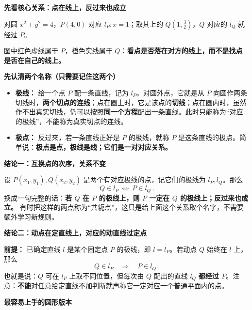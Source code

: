 \begin{statementbox}
\textbf{\textcolor{CStatement}{先看核心关系：点在线上，反过来也成立}}

对圆 $x^2+y^2=4$，$P(4,0)$ 对应 $l_P:x=1$；取其上的 $Q(1,\frac32)$，$Q$ 对应的 $l_Q$ 就经过 $P$。

\begin{center}

\end{center}
图中红色虚线属于 $P$，橙色实线属于 $Q$：\textbf{看点是否落在对方的线上，而不是找点是否在自己的线上。}

\medskip
\textbf{\textcolor{CStatement}{先认清两个名称（只需要记住这两个）}}
\begin{itemize}[leftmargin=*,itemsep=0.3em]
\item \textbf{极线：} 给一个点 $P$ 配一条直线，记为 $l_P$。对圆外点，它就是从 $P$ 向圆作两条切线时，\textbf{两个切点的连线}；点在圆上时，它是该点的\textbf{切线}；点在圆内时，虽然作不出真实切线，仍可以按照\textbf{同一个方程}配出一条直线。此时只能称为“对应的极线”，不能称为真实切点的连线。
\item \textbf{极点：} 反过来，若一条直线正好是 $P$ 的极线，就称 $P$ 是这条直线的极点。简单说：\textbf{极点是点，极线是线；它们是一对对应关系。}
\end{itemize}

\medskip
\textbf{\textcolor{CStatement}{结论一：互换点的次序，关系不变}}

设 $P(x_1,y_1),Q(x_2,y_2)$ 是两个有对应极线的点，记它们的极线为 $l_P,l_Q$。那么
\[
\boxed{\ Q\in l_P\ \Longleftrightarrow\ P\in l_Q\ }.
\]
换成一句完整的话：\textbf{若 $Q$ 在 $P$ 的极线上，则 $P$ 一定在 $Q$ 的极线上；反过来也成立。} 有时把这样的两点称为“共轭点”，这只是给上面这个关系取个名字，不需要额外学习新规则。

\medskip
\par\noindent\begin{minipage}{\linewidth}
\textbf{\textcolor{CStatement}{结论二：动点在定直线上，对应的动直线过定点}}

\textbf{前提：} 已确定直线 $l$ 是某个固定点 $P$ 的极线，即 $l=l_P$。若动点 $Q$ 始终在 $l$ 上，那么
\[
\boxed{\ Q\in l_P\quad\Longrightarrow\quad P\in l_Q\ }.
\]
也就是说：$Q$ 可在 $l_P$ 上取不同位置，但每次由 $Q$ 配出的直线 $l_Q$ \textbf{都经过 $P$}。注意：\textbf{不能}对任意给定直线不加判断就声称它一定对应一个普通平面内的点。

\end{minipage}\par
\medskip
\textbf{\textcolor{CStatement}{最容易上手的圆形版本}}


\end{statementbox}
